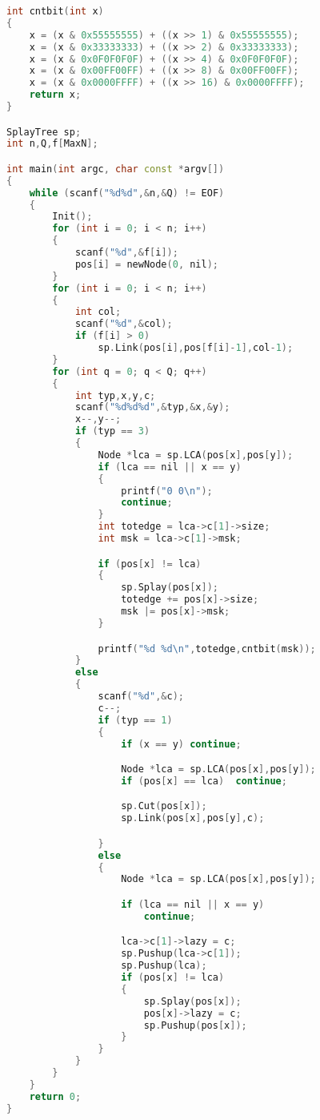 \begin{lstlisting}[language=c++]
int cntbit(int x)
{
	x = (x & 0x55555555) + ((x >> 1) & 0x55555555);
	x = (x & 0x33333333) + ((x >> 2) & 0x33333333);
	x = (x & 0x0F0F0F0F) + ((x >> 4) & 0x0F0F0F0F);
	x = (x & 0x00FF00FF) + ((x >> 8) & 0x00FF00FF);
	x = (x & 0x0000FFFF) + ((x >> 16) & 0x0000FFFF);
	return x;
}

SplayTree sp;
int n,Q,f[MaxN];

int main(int argc, char const *argv[])
{
	while (scanf("%d%d",&n,&Q) != EOF)
	{
		Init();
		for (int i = 0; i < n; i++)
		{
			scanf("%d",&f[i]);
			pos[i] = newNode(0, nil);
		}
		for (int i = 0; i < n; i++)
		{
			int col;
			scanf("%d",&col);
			if (f[i] > 0)
				sp.Link(pos[i],pos[f[i]-1],col-1);
		}
		for (int q = 0; q < Q; q++)
		{
			int typ,x,y,c;
			scanf("%d%d%d",&typ,&x,&y);
			x--,y--;
			if (typ == 3)
			{
				Node *lca = sp.LCA(pos[x],pos[y]);
				if (lca == nil || x == y)
				{
					printf("0 0\n");
					continue;
				}
				int totedge = lca->c[1]->size;
				int msk = lca->c[1]->msk;

				if (pos[x] != lca)
				{
					sp.Splay(pos[x]);
					totedge += pos[x]->size;
					msk |= pos[x]->msk;
				}

				printf("%d %d\n",totedge,cntbit(msk));
			}
			else
			{
				scanf("%d",&c);
				c--;
				if (typ == 1)
				{
					if (x == y)	continue;

					Node *lca = sp.LCA(pos[x],pos[y]);
					if (pos[x] == lca)	continue;

					sp.Cut(pos[x]);
					sp.Link(pos[x],pos[y],c);

				}
				else
				{
					Node *lca = sp.LCA(pos[x],pos[y]);

					if (lca == nil || x == y)
						continue;

					lca->c[1]->lazy = c;
					sp.Pushup(lca->c[1]);
					sp.Pushup(lca);
					if (pos[x] != lca)
					{
						sp.Splay(pos[x]);
						pos[x]->lazy = c;
						sp.Pushup(pos[x]);
					}
				}
			}
		}
	}
	return 0;
}
		\end{lstlisting}